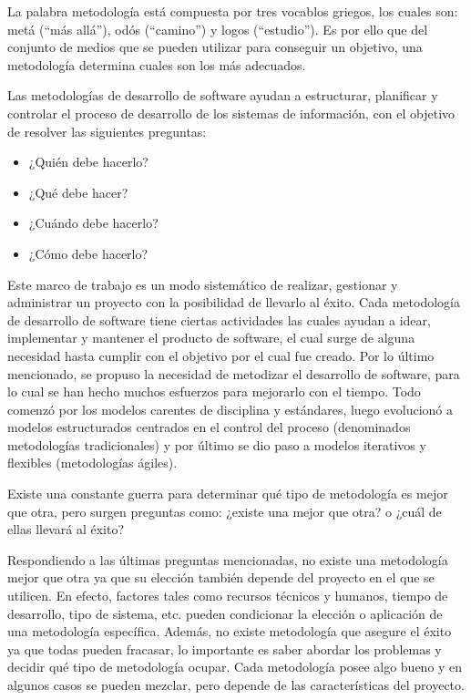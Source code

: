La palabra metodología está compuesta por tres vocablos griegos, los cuales son: metá (``más allá''), odós (``camino'') y logos (``estudio''). Es por ello que del conjunto de medios que se pueden utilizar para conseguir un objetivo, una metodología determina cuales son los más adecuados.

Las metodologías de desarrollo de software ayudan a estructurar, planificar y controlar el proceso de desarrollo de los sistemas de información, con el objetivo de resolver las siguientes preguntas:

\begin{itemize}
    \item ¿Quién debe hacerlo?
    \item ¿Qué debe hacer?
    \item ¿Cuándo debe hacerlo?
    \item ¿Cómo debe hacerlo?
\end{itemize}

Este marco de trabajo es un modo sistemático de realizar, gestionar y administrar un proyecto con la posibilidad de llevarlo al éxito. Cada metodología de desarrollo de software tiene ciertas actividades las cuales ayudan a idear, implementar y mantener el producto de software, el cual surge de alguna necesidad hasta cumplir con el objetivo por el cual fue creado. Por lo último mencionado, se propuso la necesidad de metodizar el desarrollo de software, para lo cual se han hecho muchos esfuerzos para mejorarlo con el tiempo. Todo comenzó por los modelos carentes de disciplina y estándares, luego evolucionó a modelos estructurados centrados en el control del proceso (denominados metodologías tradicionales) y por último se dio paso a modelos iterativos y flexibles (metodologías ágiles).

Existe una constante guerra para determinar qué tipo de metodología es mejor que otra, pero surgen preguntas como: ¿existe una mejor que otra? o ¿cuál de ellas llevará al éxito? 

Respondiendo a las últimas preguntas mencionadas, no existe una metodología mejor que otra ya que su elección también depende del proyecto en el que se utilicen. En efecto, factores tales como recursos técnicos y humanos, tiempo de desarrollo, tipo de sistema, etc. pueden condicionar la elección o aplicación de una metodología específica. Además, no existe metodología que asegure el éxito ya que todas pueden fracasar, lo importante es saber abordar los problemas y decidir qué tipo de metodología ocupar. Cada metodología posee algo bueno y en algunos casos se pueden mezclar, pero depende de las características del proyecto.

